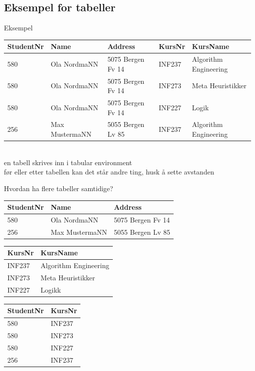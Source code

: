 \subsection*{Eksempel for tabeller}
\begin{frame}{Eksempel}
\begin{tabular}{l|l|l|l|l}
 StudentNr & Name & Address & KursNr & KursName \\\hline
 580 & Ola NordmaNN & 5075 Bergen Fv 14 & INF237 & Algorithm Engineering\\
 580 & Ola NordmaNN & 5075 Bergen Fv 14 & INF273 & Meta Heuristikker\\
 580 & Ola NordmaNN & 5075 Bergen Fv 14 & INF227 & Logik\\
 256 & Max MustermaNN & 5055 Bergen Lv 85 & INF237 & Algorithm Engineering\\
\end{tabular}
\\[5mm] %
en tabell skrives inn i tabular environment\\
før eller etter tabellen kan det står andre ting, husk å sette avstanden
\end{frame}

\begin{frame}{Hvordan ha flere tabeller samtidige?}
\begin{tabular}{l|l|l}
 StudentNr & Name & Address\\\hline
 580 & Ola NordmaNN & 5075 Bergen Fv 14\\
 256 & Max MustermaNN & 5055 Bergen Lv 85\\
\end{tabular}
\vfill
\begin{tabular}{l|l}
KursNr & KursName \\\hline
INF237 & Algorithm Engineering\\
INF273 & Meta Heuristikker\\
INF227 & Logikk\\
\end{tabular}
\hfill
\begin{tabular}{l|l}
 StudentNr & KursNr\\\hline
 580 & INF237\\
 580 & INF273\\
 580 & INF227\\
 256 & INF237\\
\end{tabular}
\end{frame}

